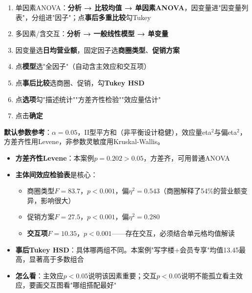 \begin{algosposs}
\begin{enumerate}
    \item 单因素ANOVA：\textbf{分析 → 比较均值 → 单因素ANOVA}，因变量进"因变量列表"，分组进"因子"；点\textbf{事后多重比较}勾Tukey
    \item 多因素/含交互：\textbf{分析 → 一般线性模型 → 单变量}
    \item 因变量选\textbf{日均营业额}，固定因子选\textbf{商圈类型}、\textbf{促销方案}
    \item 点\textbf{模型}选"全因子"（自动含主效应和交互项）
    \item 点\textbf{事后比较}选商圈、促销，勾\textbf{Tukey HSD}
    \item 点\textbf{选项}勾"描述统计""方差齐性检验""效应量估计"
    \item 点击\textbf{确定}
\end{enumerate}

\textbf{默认参数参考}：$\alpha=0.05$，II型平方和（非平衡设计稳健），效应量eta$^2$与偏eta$^2$，方差齐性用Levene，非参数灵敏度用Kruskal-Wallis。
\end{algosposs}

\begin{algoresult}
\begin{itemize}
    \item \textbf{方差齐性Levene}：本案例$p=0.202>0.05$，方差齐，可用普通ANOVA
    \item \textbf{主体间效应检验表}是核心：
    \begin{itemize}
        \item 商圈类型$F=83.7$，$p<0.001$，偏$\eta^2=0.543$（商圈解释了54\%的营业额变异，影响很大）
        \item 促销方案$F=27.5$，$p<0.001$，偏$\eta^2=0.280$
        \item \textbf{交互项}$F=10.35$，$p<0.001$——存在交互，必须结合单元格均值解读
    \end{itemize}
    \item \textbf{事后Tukey HSD}：具体哪两组不同。本案例"写字楼+会员专享"均值13.45最高，显著高于多数组合
    \item \textbf{怎么看}：主效应$p<0.05$说明该因素重要；交互$p<0.05$说明不能孤立看主效应，要画交互图看"哪组搭配最好"
\end{itemize}
\end{algoresult}

